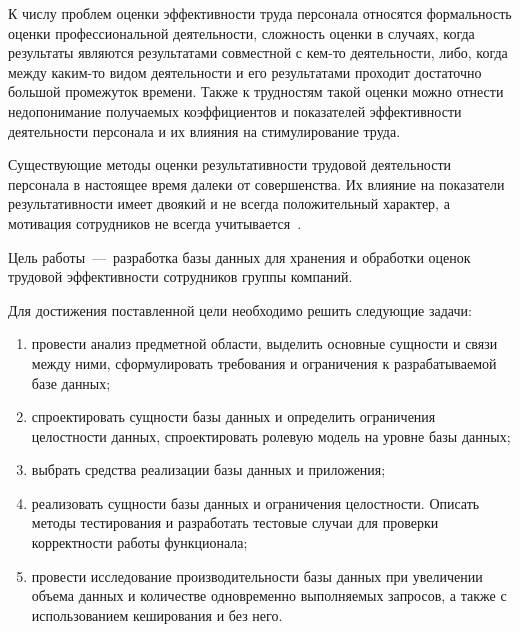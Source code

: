 
К числу проблем оценки эффективности труда персонала относятся формальность оценки профессиональной деятельности, сложность оценки в случаях, когда результаты являются результатами совместной с кем-то деятельности, либо, когда между каким-то видом деятельности и его результатами проходит достаточно большой промежуток времени. Также к трудностям такой оценки можно отнести недопонимание получаемых коэффициентов и показателей эффективности деятельности персонала и их влияния на стимулирование труда.

Существующие методы оценки результативности трудовой деятельности персонала в настоящее время далеки от совершенства. Их влияние на показатели результативности имеет двоякий и не всегда положительный характер, а мотивация сотрудников не всегда учитывается~\cite{Ilchenko}.

Цель работы~---~разработка базы данных для хранения и обработки оценок трудовой эффективности сотрудников группы компаний.

Для достижения поставленной цели необходимо решить следующие задачи:
\begin{enumerate}[label={\arabic*)}]
	\item провести анализ предметной области, выделить основные сущности и связи между ними, сформулировать требования и ограничения к разрабатываемой базе данных;
	\item спроектировать сущности базы данных и определить ограничения целостности данных, спроектировать ролевую модель на уровне базы данных;
	\item выбрать средства реализации базы данных и приложения;
	\item реализовать сущности базы данных и ограничения целостности. Описать методы тестирования и разработать тестовые случаи для проверки корректности работы функционала;
	\item провести исследование производительности базы данных при увеличении объема данных и количестве одновременно выполняемых запросов, а также с использованием кеширования и без него.
\end{enumerate}
\clearpage	